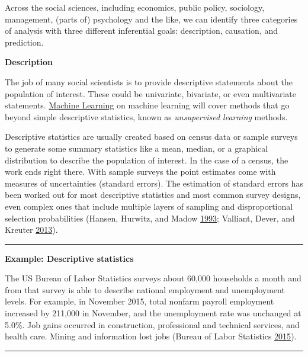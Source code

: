 \documentclass[]{krantz}
\begin{document}
Across the social sciences, including economics, public policy,
sociology, management, (parts of) psychology and the like, we can
identify three categories of analysis with three different inferential
goals: description, causation, and prediction.

\textbf{Description}

The job of many social scientists is to provide descriptive statements
about the population of interest. These could be univariate, bivariate,
or even multivariate statements. \protect\hyperlink{chap:ml}{Machine
Learning} on machine learning will cover methods that go beyond simple
descriptive statistics, known as \emph{unsupervised learning} methods.

Descriptive statistics are usually created based on census data or
sample surveys to generate some summary statistics like a mean, median,
or a graphical distribution to describe the population of interest. In
the case of a census, the work ends right there. With sample surveys the
point estimates come with measures of uncertainties (standard errors).
The estimation of standard errors has been worked out for most
descriptive statistics and most common survey designs, even complex ones
that include multiple layers of sampling and disproportional selection
probabilities (Hansen, Hurwitz, and Madow
\protect\hyperlink{ref-hansen1993sample}{1993}; Valliant, Dever, and
Kreuter \protect\hyperlink{ref-valliant2013practical}{2013}).

\begin{center}\rule{0.5\linewidth}{\linethickness}\end{center}

\textbf{Example: Descriptive statistics}

The US Bureau of Labor Statistics surveys about 60,000 households a
month and from that survey is able to describe national employment and
unemployment levels. For example, in November 2015, total nonfarm
payroll employment increased by 211,000 in November, and the
unemployment rate was unchanged at 5.0\%. Job gains occurred in
construction, professional and technical services, and health care.
Mining and information lost jobs (Bureau of Labor Statistics
\protect\hyperlink{ref-BLS2015}{2015}).

\begin{center}\rule{0.5\linewidth}{\linethickness}\end{center}
\end{document}
